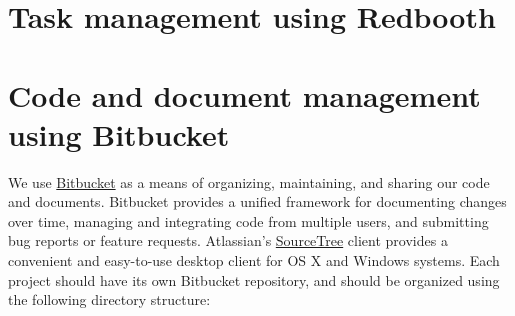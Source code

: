 \documentclass{tufte-book} %
\begin{document}



\section{Task management using Redbooth}

 \section{Code and document management using Bitbucket}\label{sec:bitbucket}
 We use \href{https://www.bitbucket.org/}{Bitbucket} as a means of organizing, maintaining, and sharing
 our code and documents.  Bitbucket provides a unified framework for
 documenting changes over time, managing and integrating code from
 multiple users, and submitting bug reports or feature requests. 
Atlassian's
 \href{https://www.atlassian.com/software/sourcetree/overview?_mid=1ba3573dadf246f44f2a97bc50bfd72e&gclid=Cj0KEQiA4OqnBRDAj9aazvPji9ABEiQANq28oBGvgRhznXBb_RDL6QRe0IM7vvEUXFkRDoWBSbpmsmAaAkCE8P8HAQ}{SourceTree}
 client provides a convenient and easy-to-use desktop client for OS X
 and Windows systems.  Each project should have its own Bitbucket
 repository, and should be organized using the following directory structure:
\end{document}
